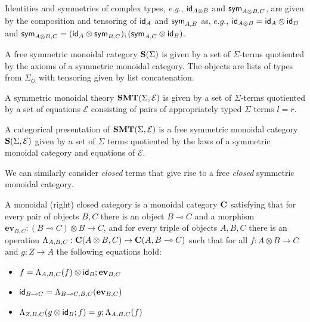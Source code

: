 Identities and symmetries of complex types, \textit{e.g.}, $\textsf{id}_{A \otimes B}$ and $\textsf{sym}_{A \otimes B, C}$, are given by the composition and tensoring of $\textsf{id}_{A}$ and $\textsf{sym}_{A,B}$ as, $\textit{e.g.}$, $\textsf{id}_{A \otimes B} = \textsf{id}_{A} \otimes \textsf{id}_{B}$ and $\textsf{sym}_{A \otimes B, C} = (\textsf{id}_{A} \otimes \textsf{sym}_{B,C});(\textsf{sym}_{A,C} \otimes \textsf{id}_{B})$.

\begin{definition}
A free symmetric monoidal category $\mathbf{S}(\Sigma)$ is given by a set of $\Sigma$-terms quotiented by the axioms of a symmetric monoidal category.
The objects are lists of types from $\Sigma_{O}$ with tensoring given by list concatenation.
\end{definition}

\begin{definition}
A symmetric monoidal theory $\mathbf{SMT}(\Sigma, \mathcal{E})$ is given by a set of $\Sigma$-terms quotiented by a set of equations $\mathcal{E}$ consisting of pairs of appropriately typed $\Sigma$ terms $l = r$.
\end{definition}

\begin{definition}
A categorical presentation of  $\mathbf{SMT}(\Sigma, \mathcal{E})$ is a free symmetric monoidal category $\mathbf{S}(\Sigma, \mathcal{E})$ given by a set of $\Sigma$ terms quotiented by the laws of a symmetric monoidal category and equations of $\mathcal{E}$.
\end{definition}

We can similarly consider \textit{closed} terms that give rise to a free \textit{closed} symmetric monoidal category.

\begin{definition}
\label{def:closed}
A monoidal (right) closed category is a monoidal category $\mathbf{C}$ satisfying that for
every pair of objects $B,C$ there is an object $B \multimap C$ and a morphism $\textbf{ev}_{B,C} : (B \multimap C) \otimes B \to
C$, and for every triple of objects $A,B,C$ there is an operation $\Lambda_{A,B,C} : \mathbf{C}(A \otimes B,C) \to
\mathbf{C}(A,B \multimap{} C)$ such that for all $f : A \otimes B \to C$ and $g : Z \to A$ the following equations hold:
\begin{itemize}
\item $f = \Lambda_{A,B,C}(f) \otimes \textsf{id}_{B}; \textbf{ev}_{B,C}$
\item $\textsf{id}_{B \multimap{} C} = \Lambda_{B \multimap{} C,B,C}(\textbf{ev}_{B,C})$
\item $\Lambda_{Z,B,C}(g \otimes \textsf{id}_{B}; f) = g;\Lambda_{A,B,C}(f)$
\end{itemize}
\end{definition}

